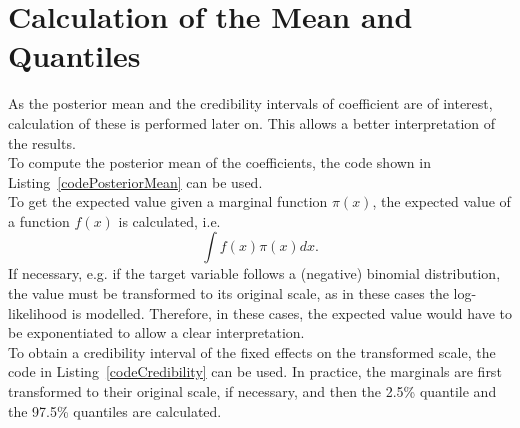 \section{Calculation of the Mean and Quantiles}\label{sec:mean_iv}
As the posterior mean and the credibility intervals of coefficient are of interest, calculation of these is performed later on. This allows a better interpretation of the results. \\
To compute the posterior mean of the coefficients, the code shown in Listing~\ref{codePosteriorMean} can be used. \\
To get the expected value given a marginal function $\pi\left(x\right)$, the expected value of a function $f\left(x\right)$ is calculated, i.e.
\begin{equation*}
    \int f\left(x\right)\pi\left(x\right)dx.
\end{equation*}
If necessary, e.g. if the target variable follows a (negative) binomial distribution, the value must be transformed to its original scale, as in these cases the log-likelihood is modelled. Therefore, in these cases, the expected value would have to be exponentiated to allow a clear interpretation. \\
To obtain a credibility interval of the fixed effects on the transformed scale, the code in Listing~\ref{codeCredibility} can be used. In practice, the marginals are first transformed to their original scale, if necessary, and then the 2.5\% quantile and the 97.5\% quantiles are calculated.
